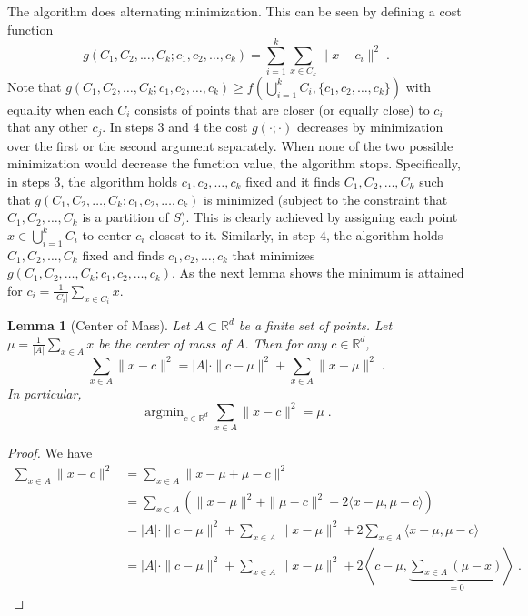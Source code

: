 \documentclass{article}
\newtheorem{lemma}{Lemma}
\newcommand{\R}{\mathbb{R}}
\newcommand{\norm}[1]{\|{#1}\|}
\DeclareMathOperator*{\argmin}{argmin}
\begin{document}
The algorithm does alternating minimization.  This can be seen by defining a cost
function
$$
g(C_1, C_2, \dots, C_k; c_1, c_2, \dots, c_k) = \sum_{i=1}^k \sum_{x \in C_k} \norm{x - c_i}^2 \; .
$$
Note that $g(C_1, C_2, \dots, C_k; c_1, c_2, \dots, c_k) \ge f(\bigcup_{i=1}^k
C_i, \{c_1, c_2, \dots, c_k\})$ with equality when each $C_i$ consists of
points that are closer (or equally close) to $c_i$ that any other $c_j$. In
steps $3$ and $4$ the cost $g(\cdot;\cdot)$ decreases by minimization over the
first or the second argument separately.  When none of the two possible
minimization would decrease the function value, the algorithm stops.
Specifically, in steps $3$, the algorithm holds $c_1, c_2, \dots, c_k$ fixed
and it finds $C_1, C_2, \dots, C_k$ such that $g(C_1, C_2, \dots, C_k; c_1,
c_2, \dots, c_k)$ is minimized (subject to the constraint that $C_1, C_2,
\dots, C_k$ is a partition of $S$). This is clearly achieved by assigning each
point $x \in \bigcup_{i=1}^k C_i$ to center $c_i$ closest to it. Similarly, in
step $4$, the algorithm holds $C_1, C_2, \dots, C_k$ fixed and finds $c_1, c_2,
\dots, c_k$ that minimizes $g(C_1, C_2, \dots, C_k; c_1, c_2, \dots, c_k)$.  As
the next lemma shows the minimum is attained for $c_i = \frac{1}{|C_i|} \sum_{x
\in C_i} x$.

\begin{lemma}[Center of Mass]
\label{lemma:center-of-mass}
Let $A \subset \R^d$ be a finite set of points. Let $\mu = \frac{1}{|A|}
\sum_{x \in A} x$ be the center of mass of $A$. Then for any $c \in \R^d$,
$$
\sum_{x \in A} \norm{x - c}^2 = |A| \cdot \norm{c - \mu}^2 + \sum_{x \in A} \norm{x - \mu}^2 \; .
$$
In particular,
$$
\argmin_{c \in \R^d} \sum_{x \in A} \norm{x - c}^2 = \mu \; .
$$
\end{lemma}

\begin{proof}
We have
\begin{align*}
\sum_{x \in A} \norm{x - c}^2
& = \sum_{x \in A} \norm{x - \mu + \mu - c}^2 \\
& = \sum_{x \in A} \left( \norm{x - \mu}^2  + \norm{\mu - c}^2 + 2 \langle x - \mu, \mu - c \rangle \right) \\
& = |A| \cdot \norm{c - \mu}^2 +  \sum_{x \in A} \norm{x - \mu}^2  + 2 \sum_{x \in A} \langle x - \mu, \mu - c \rangle \\
& = |A| \cdot \norm{c - \mu}^2 +  \sum_{x \in A} \norm{x - \mu}^2  + 2 \left\langle c - \mu,  \underbrace{\sum_{x \in A} (\mu - x)}_{=0} \right\rangle \; .
\end{align*}
\end{proof}
\end{document}
